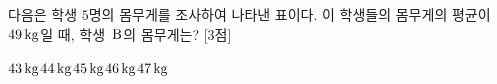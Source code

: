 다음은 학생 $5$명의 몸무게를 조사하여 나타낸 표이다. 이 학생들의 몸무게의 평균이 $49\mkern3mu \mathrm{kg}$일 때, 학생~$\mathrm{B}$의 몸무게는? \mbox{[3점]}\par\nobreak{}
\begin{choices32}{$43\mkern3mu \mathrm{kg}$}{$44\mkern3mu \mathrm{kg}$}{$45\mkern3mu \mathrm{kg}$}{$46\mkern3mu \mathrm{kg}$}{$47\mkern3mu \mathrm{kg}$}\end{choices32}
